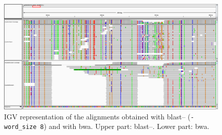 \begin{figure}
\includegraphics[scale=0.45]{img/igv01}
\caption[IGV representation of the alignments obtained with \acrshort{blast}--\blastobam{} and with \acrshort{bwa}.]
{IGV representation of the alignments obtained with \acrshort{blast}--\blastobam{} (\texttt{-word\_size~8}) and with \acrshort{bwa}. Upper part: \gls{blast}--\blastobam{}. Lower part: \gls{bwa}.}\label{fig:igv}
\end{figure}
